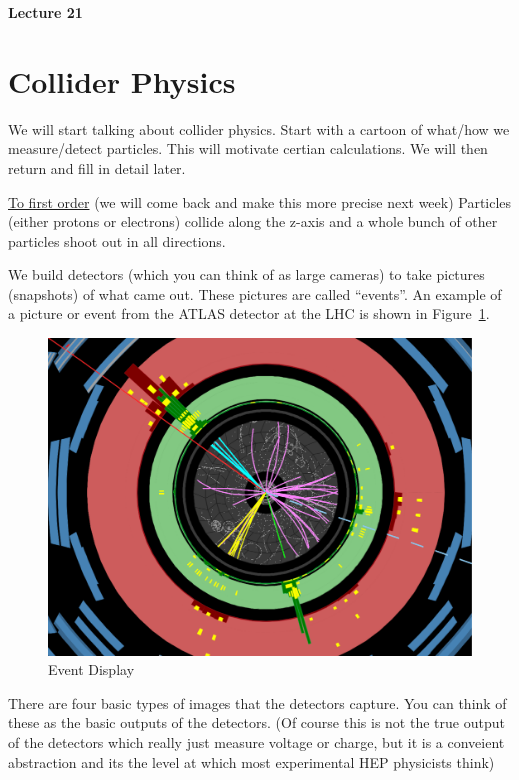 \thispagestyle{fancy}

\begin{center}
{\huge \textbf{Lecture 21}}
\end{center}

{\fontsize{14}{16}\selectfont

\section*{Collider Physics}

We will start talking  about collider physics. 
Start with a cartoon of what/how we measure/detect particles.
This will motivate certian calculations.  
We will then return and fill in detail later.


\underline{To first order}  (we will come back and make this more precise next week)
Particles (either protons or electrons) collide along the z-axis and a whole bunch of other particles shoot out in all directions.   

We build detectors (which you can think of as large cameras) to take pictures (snapshots) of what came out. 
These pictures are called ``events''.
An example of a picture or event from the ATLAS detector at the LHC is shown in Figure~\ref{fig:EventDisplay}.


\begin{figure}[h]
\centering
\includegraphics[width=1.0\textwidth]{./EventDisplayNoLabel.pdf}
\caption{Event Display}\label{fig:EventDisplay}
\end{figure}

\clearpage

There are four basic types of images that the detectors capture. 
You can think of these as the basic outputs of the detectors. 
(Of course this is not the true output of the detectors which really just measure voltage or charge, but it is a conveient abstraction and its the level at which most experimental HEP physicists think)

}
